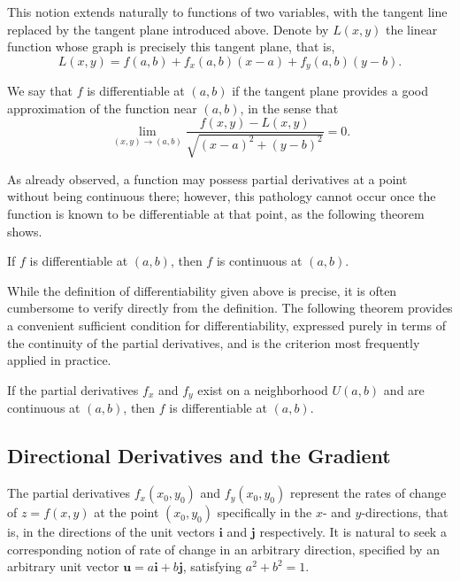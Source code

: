 This notion extends naturally to functions of two variables, with the tangent line replaced by the tangent plane introduced above. Denote by $L(x,y)$ the linear function whose graph is precisely this tangent plane, that is,
\[
L(x,y) = f(a,b) + f_x(a,b)(x-a) + f_y(a,b)(y-b).
\]

\begin{definition}
We say that $f$ is differentiable at $(a,b)$ if the tangent plane provides a good approximation of the function near $(a,b)$, in the sense that
\[
\lim_{(x,y) \to (a,b)} \frac{f(x,y) - L(x,y)}{\sqrt{(x-a)^2+(y-b)^2}} = 0.
\]

\end{definition}

As already observed, a function may possess partial derivatives at a point without being continuous there; however, this pathology cannot occur once the function is known to be differentiable at that point, as the following theorem shows.

\begin{theorem}
If $f$ is differentiable at $(a,b)$, then $f$ is continuous at $(a,b)$.

\end{theorem}

While the definition of differentiability given above is precise, it is often cumbersome to verify directly from the definition. The following theorem provides a convenient sufficient condition for differentiability, expressed purely in terms of the continuity of the partial derivatives, and is the criterion most frequently applied in practice.

\begin{theorem}
If the partial derivatives $f_x$ and $f_y$ exist on a neighborhood $U(a,b)$ and are continuous at $(a,b)$, then $f$ is differentiable at $(a,b)$.

\end{theorem}

\subsection{Directional Derivatives and the Gradient}

The partial derivatives $f_x(x_0,y_0)$ and $f_y(x_0,y_0)$ represent the rates of change of $z=f(x,y)$ at the point $(x_0,y_0)$ specifically in the $x$- and $y$-directions, that is, in the directions of the unit vectors $\mathbf{i}$ and $\mathbf{j}$ respectively. It is natural to seek a corresponding notion of rate of change in an arbitrary direction, specified by an arbitrary unit vector $\mathbf{u} = a\mathbf{i} + b\mathbf{j}$, satisfying $a^2+b^2=1$.

